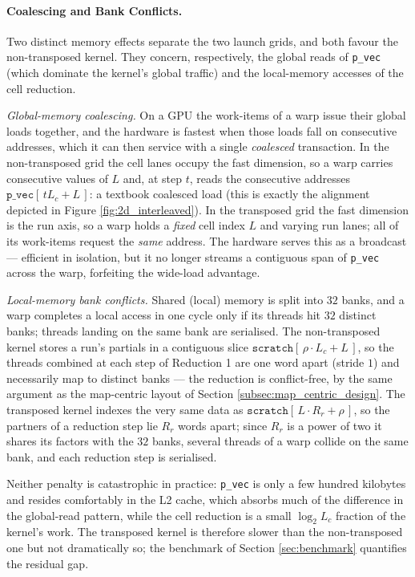\paragraph{Coalescing and Bank Conflicts.}
Two distinct memory effects separate the two launch grids, and both favour the non-transposed kernel. They concern, respectively, the global reads of \texttt{p\_vec} (which dominate the kernel's global traffic) and the local-memory accesses of the cell reduction.

\emph{Global-memory coalescing.} On a GPU the work-items of a warp issue their global loads together, and the hardware is fastest when those loads fall on consecutive addresses, which it can then service with a single \emph{coalesced} transaction. In the non-transposed grid the cell lanes occupy the fast dimension, so a warp carries consecutive values of $L$ and, at step $t$, reads the consecutive addresses $\texttt{p\_vec}[\,t L_c + L\,]$: a textbook coalesced load (this is exactly the alignment depicted in Figure \ref{fig:2d_interleaved}). In the transposed grid the fast dimension is the run axis, so a warp holds a \emph{fixed} cell index $L$ and varying run lanes; all of its work-items request the \emph{same} address. The hardware serves this as a broadcast --- efficient in isolation, but it no longer streams a contiguous span of \texttt{p\_vec} across the warp, forfeiting the wide-load advantage.

\emph{Local-memory bank conflicts.} Shared (local) memory is split into $32$ banks, and a warp completes a local access in one cycle only if its threads hit $32$ distinct banks; threads landing on the same bank are serialised. The non-transposed kernel stores a run's partials in a contiguous slice $\texttt{scratch}[\,\rho \cdot L_c + L\,]$, so the threads combined at each step of Reduction 1 are one word apart (stride $1$) and necessarily map to distinct banks --- the reduction is conflict-free, by the same argument as the map-centric layout of Section \ref{subsec:map_centric_design}. The transposed kernel indexes the very same data as $\texttt{scratch}[\,L \cdot R_r + \rho\,]$, so the partners of a reduction step lie $R_r$ words apart; since $R_r$ is a power of two it shares its factors with the $32$ banks, several threads of a warp collide on the same bank, and each reduction step is serialised.

Neither penalty is catastrophic in practice: \texttt{p\_vec} is only a few hundred kilobytes and resides comfortably in the L2 cache, which absorbs much of the difference in the global-read pattern, while the cell reduction is a small $\log_2 L_c$ fraction of the kernel's work. The transposed kernel is therefore slower than the non-transposed one but not dramatically so; the benchmark of Section \ref{sec:benchmark} quantifies the residual gap.

